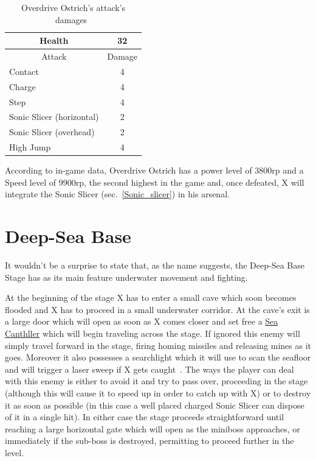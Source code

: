 \begin{table}[htp]
	\centering
	\begin{tabular}[h]{l c}
		\toprule
		\multicolumn{1}{c}{Health}  & 32 \\
		\midrule
		\multicolumn{1}{c}{Attack} & \multicolumn{1}{c}{Damage}\\
		Contact & 4 \\
		Charge & 4\\
		Step& 4\\
		Sonic Slicer (horizontal) & 2\\
		Sonic Slicer (overhead) & 2\\
		High Jump & 4\\
		\bottomrule
	\end{tabular}
	\caption{Overdrive Ostrich's attack's damages~\cite{wiki:Overdrive_Ostrich}}
\end{table}
According to in-game data, Overdrive Ostrich has a power level of 3800rp and a Speed level of 9900rp, the second highest in the game and, once defeated, X will integrate the Sonic Slicer (sec.~\ref{Sonic_slicer}) in his arsenal.



\section{Deep-Sea Base}
It wouldn't be a surprise to state that, as the name suggests, the Deep-Sea Base Stage has as its main feature underwater movement and fighting.

At the beginning of the stage X has to enter a small cave which soon becomes flooded and X has to proceed in a small underwater corridor. At the cave's exit  is a large door which will open as soon as X comes closer and set free a \hyperlink{miniboss:Sea_Canthller}{Sea Canthller} which will begin traveling across the stage. If ignored this enemy will simply travel forward in the stage, firing homing missiles and releasing mines as it goes. Moreover it also possesses a searchlight which it will use to scan the seafloor and will trigger a laser sweep if X gets caught~\cite{wiki:Sea_Canthller}. The ways the player can deal with this enemy is either to avoid it and try to pass over, proceeding in the stage (although this will cause it to speed up in order to catch up with X) or to destroy it as soon as possible (in this case a well placed charged Sonic Slicer can dispose of it in a single hit). In either case the stage proceeds straightforward until reaching a large horizontal gate which will open as the miniboss approaches, or immediately if the sub-boss is destroyed, permitting to proceed further in the level.

